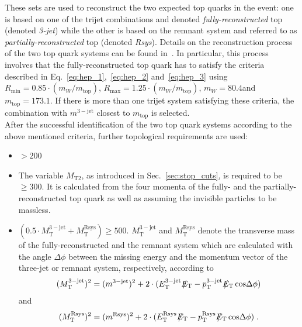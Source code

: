 These sets are used to reconstruct the two expected top quarks in the event: one is based on one of the trijet combinations and denoted \textit{fully-reconstructed} top (denoted \textit{3-jet}) while the other is based on the remnant system and referred to as \textit{partially-reconstructed} top (denoted \textit{Rsys}). Details on the reconstruction process of the two top quark systems can be found in~\cite{CMS-PAS-SUS-13-015}. In particular, this process involves that the fully-reconstructed top quark has to satisfy the criteria described in Eq.~\ref{eq:hep_1},~\ref{eq:hep_2} and~\ref{eq:hep_3} using $R_\mathrm{min} = 0.85 \cdot (m_W/m_\mathrm{top})$, $R_\mathrm{max} = 1.25 \cdot (m_W/m_\mathrm{top})$, $m_W = 80.4$\gev and $m_\mathrm{top} = 173.1$\gev. If there is more than one trijet system satisfying these criteria, the combination with $m^{3-\mathrm{jet}}$ closest to $m_\mathrm{top}$ is selected. \\
After the successful identification of the two top quark systems according to the above mentioned criteria, further topological requirements are used:
\begin{itemize}
 \item \met $> 200$\gev
 \item The variable $M_\mathrm{T2}$, as introduced in Sec.~\ref{sec:stop_cuts}, is required to be $\ge 300$\gev. It is calculated from the four momenta of the fully- and the partially-reconstructed top quark as well as \met assuming the invisible particles to be massless. 
 \item $(0.5 \cdot M_\mathrm{T}^\mathrm{3-jet} + M_\mathrm{T}^\mathrm{Rsys}) \ge 500$\gev. $ M_\mathrm{T}^\mathrm{3-jet}$ and $M_\mathrm{T}^\mathrm{Rsys}$ denote the transverse mass of the fully-reconstructed and the remnant system which are calculated with the angle $\Delta \phi$ between the missing energy and the momentum vector of the three-jet or remnant system, respectively, according to
\begin{equation*}
( M_\mathrm{T}^\mathrm{3-jet})^2 = (m^{3-\mathrm{jet}})^2 + 2 \cdot (E_\mathrm{T}^\mathrm{3-jet} \, \slash\mkern-12mu{E}_{\text{T}} - p_\mathrm{T}^\mathrm{3-jet} \, \slash\mkern-12mu{E}_{\text{T}} \, \mathrm{cos} \Delta \phi)
\end{equation*} 
and 
\begin{equation*}
( M_\mathrm{T}^\mathrm{Rsys})^2 = (m^\mathrm{Rsys})^2 + 2 \cdot (E_\mathrm{T}^\mathrm{Rsys} \, \slash\mkern-12mu{E}_{\text{T}} - p_\mathrm{T}^\mathrm{Rsys} \, \slash\mkern-12mu{E}_{\text{T}} \, \mathrm{cos} \Delta \phi) \; .
\end{equation*} 
\end{itemize}
